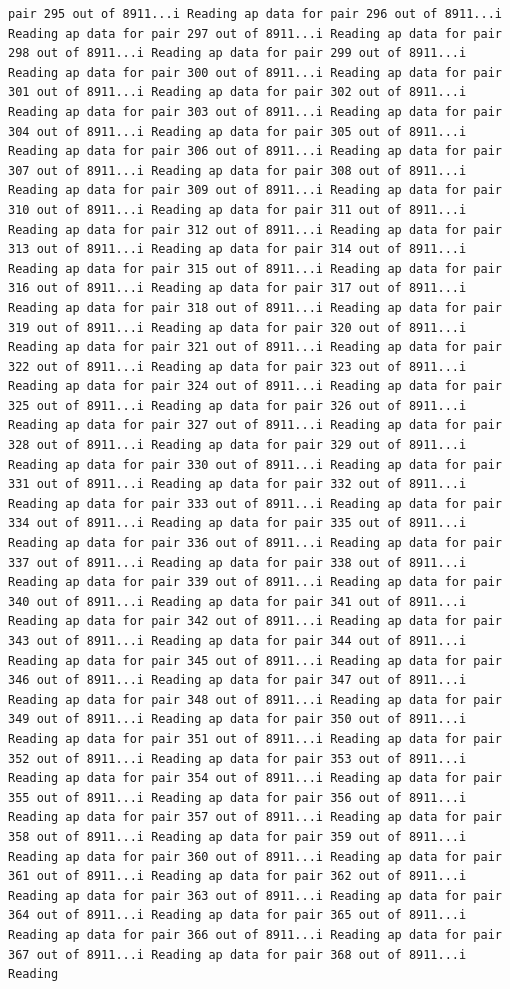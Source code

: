 \documentclass[
]{article}
\begin{document}
\begin{verbatim}
pair 295 out of 8911...i Reading ap data for pair 296 out of 8911...i Reading ap data for pair 297 out of 8911...i Reading ap data for pair 298 out of 8911...i Reading ap data for pair 299 out of 8911...i Reading ap data for pair 300 out of 8911...i Reading ap data for pair 301 out of 8911...i Reading ap data for pair 302 out of 8911...i Reading ap data for pair 303 out of 8911...i Reading ap data for pair 304 out of 8911...i Reading ap data for pair 305 out of 8911...i Reading ap data for pair 306 out of 8911...i Reading ap data for pair 307 out of 8911...i Reading ap data for pair 308 out of 8911...i Reading ap data for pair 309 out of 8911...i Reading ap data for pair 310 out of 8911...i Reading ap data for pair 311 out of 8911...i Reading ap data for pair 312 out of 8911...i Reading ap data for pair 313 out of 8911...i Reading ap data for pair 314 out of 8911...i Reading ap data for pair 315 out of 8911...i Reading ap data for pair 316 out of 8911...i Reading ap data for pair 317 out of 8911...i Reading ap data for pair 318 out of 8911...i Reading ap data for pair 319 out of 8911...i Reading ap data for pair 320 out of 8911...i Reading ap data for pair 321 out of 8911...i Reading ap data for pair 322 out of 8911...i Reading ap data for pair 323 out of 8911...i Reading ap data for pair 324 out of 8911...i Reading ap data for pair 325 out of 8911...i Reading ap data for pair 326 out of 8911...i Reading ap data for pair 327 out of 8911...i Reading ap data for pair 328 out of 8911...i Reading ap data for pair 329 out of 8911...i Reading ap data for pair 330 out of 8911...i Reading ap data for pair 331 out of 8911...i Reading ap data for pair 332 out of 8911...i Reading ap data for pair 333 out of 8911...i Reading ap data for pair 334 out of 8911...i Reading ap data for pair 335 out of 8911...i Reading ap data for pair 336 out of 8911...i Reading ap data for pair 337 out of 8911...i Reading ap data for pair 338 out of 8911...i Reading ap data for pair 339 out of 8911...i Reading ap data for pair 340 out of 8911...i Reading ap data for pair 341 out of 8911...i Reading ap data for pair 342 out of 8911...i Reading ap data for pair 343 out of 8911...i Reading ap data for pair 344 out of 8911...i Reading ap data for pair 345 out of 8911...i Reading ap data for pair 346 out of 8911...i Reading ap data for pair 347 out of 8911...i Reading ap data for pair 348 out of 8911...i Reading ap data for pair 349 out of 8911...i Reading ap data for pair 350 out of 8911...i Reading ap data for pair 351 out of 8911...i Reading ap data for pair 352 out of 8911...i Reading ap data for pair 353 out of 8911...i Reading ap data for pair 354 out of 8911...i Reading ap data for pair 355 out of 8911...i Reading ap data for pair 356 out of 8911...i Reading ap data for pair 357 out of 8911...i Reading ap data for pair 358 out of 8911...i Reading ap data for pair 359 out of 8911...i Reading ap data for pair 360 out of 8911...i Reading ap data for pair 361 out of 8911...i Reading ap data for pair 362 out of 8911...i Reading ap data for pair 363 out of 8911...i Reading ap data for pair 364 out of 8911...i Reading ap data for pair 365 out of 8911...i Reading ap data for pair 366 out of 8911...i Reading ap data for pair 367 out of 8911...i Reading ap data for pair 368 out of 8911...i Reading 
\end{verbatim}
\end{document}
